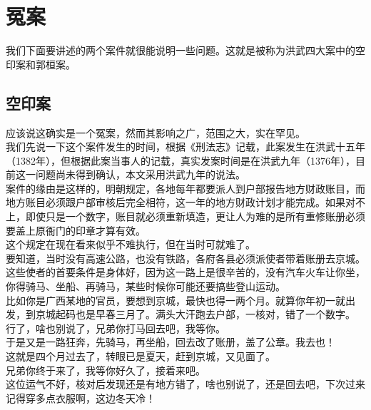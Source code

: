 \section{冤案}
\ifnum{}
	\begin{multicols}{\theparacolNo}
\fi
我们下面要讲述的两个案件就很能说明一些问题。这就是被称为洪武四大案中的空印案和郭桓案。\\

\subsection{空印案}
应该说这确实是一个冤案，然而其影响之广，范围之大，实在罕见。\\

我们先说一下这个案件发生的时间，根据《刑法志》记载，此案发生在洪武十五年（1382年），但根据此案当事人的记载，真实发案时间是在洪武九年（1376年），目前这一问题尚未得到确认，本文采用洪武九年的说法。\\

案件的缘由是这样的，明朝规定，各地每年都要派人到户部报告地方财政账目，而地方账目必须跟户部审核后完全相符，这一年的地方财政计划才能完成。如果对不上，即使只是一个数字，账目就必须重新填造，更让人为难的是所有重修账册必须要盖上原衙门的印章才算有效。\\

这个规定在现在看来似乎不难执行，但在当时可就难了。\\

要知道，当时没有高速公路，也没有铁路，各府各县必须派使者带着账册去京城。这些使者的首要条件是身体好，因为这一路上是很辛苦的，没有汽车火车让你坐，你得骑马、坐船、再骑马，某些时候你可能还要搞些登山运动。\\

比如你是广西某地的官员，要想到京城，最快也得一两个月。就算你年初一就出发，到京城起码也是早春三月了。满头大汗跑去户部，一核对，错了一个数字。\\

行了，啥也别说了，兄弟你打马回去吧，我等你。\\

于是又是一路狂奔，先骑马，再坐船，回去改了账册，盖了公章。我去也！\\

这就是四个月过去了，转眼已是夏天，赶到京城，又见面了。\\

兄弟你终于来了，我等你好久了，接着来吧。\\

这位运气不好，核对后发现还是有地方错了，啥也别说了，还是回去吧，下次过来记得穿多点衣服啊，这边冬天冷！\\


\end{multicols}
